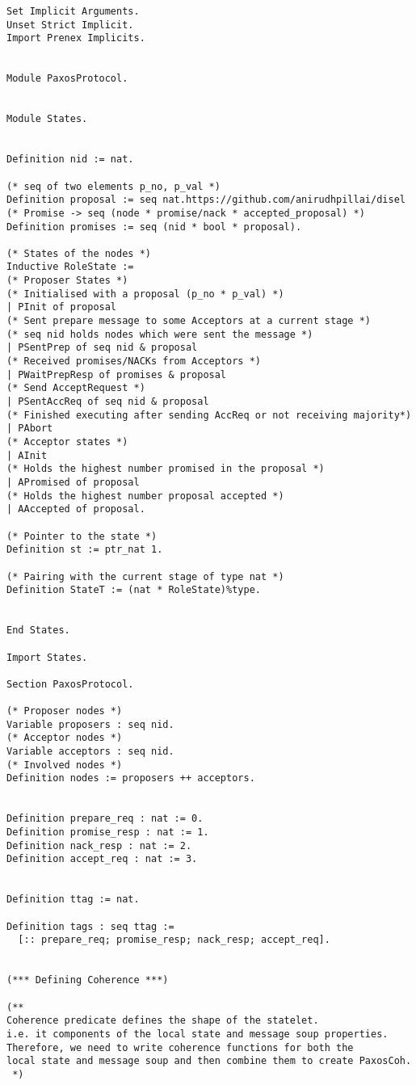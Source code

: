 \begin{landscape}
\begin{multicols*}{2}
\begin{lstlisting}[style=SourceCodeListing]
Set Implicit Arguments.
Unset Strict Implicit.
Import Prenex Implicits.


Module PaxosProtocol.


Module States.


Definition nid := nat.

(* seq of two elements p_no, p_val *)
Definition proposal := seq nat.https://github.com/anirudhpillai/disel
(* Promise -> seq (node * promise/nack * accepted_proposal) *)
Definition promises := seq (nid * bool * proposal).

(* States of the nodes *)
Inductive RoleState :=
(* Proposer States *)
(* Initialised with a proposal (p_no * p_val) *)
| PInit of proposal
(* Sent prepare message to some Acceptors at a current stage *)
(* seq nid holds nodes which were sent the message *)
| PSentPrep of seq nid & proposal
(* Received promises/NACKs from Acceptors *)
| PWaitPrepResp of promises & proposal
(* Send AcceptRequest *)
| PSentAccReq of seq nid & proposal
(* Finished executing after sending AccReq or not receiving majority*)
| PAbort
(* Acceptor states *)
| AInit
(* Holds the highest number promised in the proposal *)
| APromised of proposal
(* Holds the highest number proposal accepted *)
| AAccepted of proposal.

(* Pointer to the state *)
Definition st := ptr_nat 1.

(* Pairing with the current stage of type nat *)
Definition StateT := (nat * RoleState)%type.


End States.

Import States.

Section PaxosProtocol.

(* Proposer nodes *)
Variable proposers : seq nid.
(* Acceptor nodes *)
Variable acceptors : seq nid.
(* Involved nodes *)
Definition nodes := proposers ++ acceptors.


Definition prepare_req : nat := 0.
Definition promise_resp : nat := 1.
Definition nack_resp : nat := 2.
Definition accept_req : nat := 3.


Definition ttag := nat.

Definition tags : seq ttag :=
  [:: prepare_req; promise_resp; nack_resp; accept_req].


(*** Defining Coherence ***)

(**
Coherence predicate defines the shape of the statelet.
i.e. it components of the local state and message soup properties.
Therefore, we need to write coherence functions for both the
local state and message soup and then combine them to create PaxosCoh.
 *)



\end{lstlisting}
\end{multicols*}
\end{landscape}
